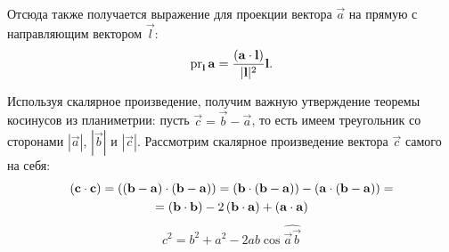 Отсюда также получается выражение для проекции вектора $\vec{a}$ на прямую с направляющим вектором $\vec{l}$:
\begin{equation}
	\operatorname{pr}_{\mathbf{l}} \mathbf{a} = \frac{\left(\mathbf{a} \cdot \mathbf{l}\right)}{|\mathbf{l}|^2} \mathbf{l}.
\end{equation}

Используя скалярное произведение, получим важную утверждение теоремы косинусов из планиметрии: пусть $\vec{c} = \vec{b} - \vec{a}$, то есть имеем треугольник со сторонами $|\vec{a}|$, $|\vec{b}|$ и $|\vec{c}|$. Рассмотрим скалярное произведение вектора $\vec{c}$ самого на себя:
\begin{multline}
	\left(\mathbf{c} \cdot \mathbf{c}\right) = \left(\mathbf{(b - a)} \cdot \mathbf{(b - a)}\right) = \left(\mathbf{b} \cdot \mathbf{(b-a)}\right) - \left(\mathbf{a} \cdot \mathbf{(b - a)}\right) = \\
	= \left(\mathbf{b} \cdot \mathbf{b}\right) - 2\left(\mathbf{b} \cdot \mathbf{a}\right) + \left(\mathbf{a} \cdot \mathbf{a}\right)
\end{multline}
\begin{equation}
	c^2 = b^2 + a^2 - 2ab\cos \widehat{\vec{a}\vec{b}}
\end{equation}
